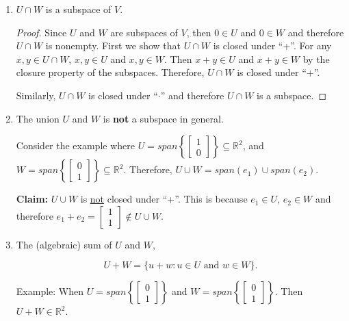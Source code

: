 \documentclass[12pt]{article}
\theoremstyle{definition}
\begin{document}
\begin{enumerate}[label = (\arabic*)]
\item $U \cap W$ is a subspace of $V$.

\begin{proof}
Since $U$ and $W$ are subspaces of $V$, then $0 \in U$ and $0 \in W$ and therefore
$U \cap W$ is nonempty. First we show that $U \cap W$ is closed under ``+''. For any
$x, y \in U \cap W$, $x, y \in U$ and $x, y \in W$. Then $x + y \in U$ and
$x + y \in W$ by the closure property of the subspaces. Therefore, $U \cap W$ is
closed under ``+''.

Similarly, $U \cap W$ is closed under ``$\cdot$'' and therefore $U \cap W$ is a subspace.
\end{proof}

\item The union $U$ and $W$ is \textbf{not} a subspace in general.

Consider the example where 
$U = span \left\{ \begin{bmatrix} 1 \\ 0 \end{bmatrix} \right\} \subseteq \mathbb{R}^2$, and
$W = span \left\{ \begin{bmatrix} 0 \\ 1 \end{bmatrix} \right\} \subseteq \mathbb{R}^2$.
Therefore, $U \cup W = span(e_1) \cup span(e_2)$.

\vspace{0.2cm}

\textbf{Claim:} $U \cup W$ is \underline{not} closed under ``+''. This is because 
$e_1 \in U$, $e_2 \in W$ and therefore $e_1 + e_2 = \begin{bmatrix} 1 \\ 1 \end{bmatrix} \notin U \cup W$.

\item The (algebraic) sum of $U$ and $W$,

\[U + W = \{u + w : u \in U \text{ and } w \in W \}. \]

Example: When $U = span \left\{ \begin{bmatrix} 0 \\ 1 \end{bmatrix} \right\}$ and
$W = span \left\{ \begin{bmatrix} 0 \\ 1 \end{bmatrix} \right\}$. Then $U + W \in \mathbb{R}^2$.


\end{enumerate}
\end{document}

